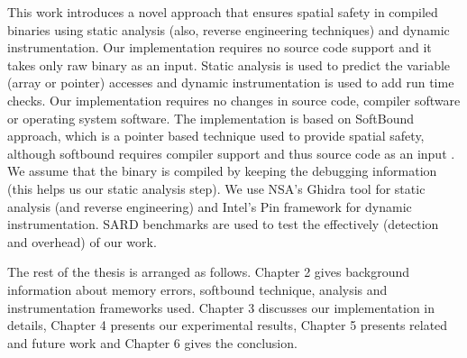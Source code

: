 This work introduces a novel approach that ensures spatial safety in compiled binaries using static analysis (also, reverse engineering techniques) and dynamic instrumentation. Our implementation requires no source code support and it takes only raw binary as an input. Static analysis is used to predict the variable (array or pointer) accesses and dynamic instrumentation is used to add run time checks. Our implementation requires no changes in source code, compiler software or operating system software. The implementation is based on SoftBound approach, which is a pointer based technique used to provide spatial safety, although softbound requires compiler support and thus source code as an input \citep{nagarakatte2009softbound}. We assume that the binary is compiled by keeping the debugging information (this helps us our static analysis step). We use NSA's Ghidra tool for static analysis (and reverse engineering) and Intel's Pin framework for dynamic instrumentation. SARD benchmarks \citep{sardcite} are used to test the effectively (detection and overhead) of our work.

The rest of the thesis is arranged as follows. 
Chapter 2 gives background information about memory errors, softbound technique, analysis and instrumentation frameworks used. 
Chapter 3 discusses our implementation in details, Chapter 4 presents our experimental results, Chapter 5 presents related and future work and Chapter 6 gives the conclusion.
